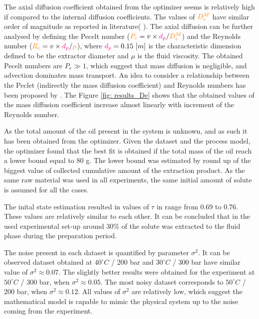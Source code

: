 \documentclass[../Article_Model_Parameters.tex]{subfiles}
\begin{document}
	The axial diffusion coefficient obtained from the optimizer seems is relatively high if compared to the internal diffusion coefficients. The values of ${\color{orange}D_e^M}$ have similar order of magnitude as reported in literature( \citet{ReisVasco2000}). %
	The axial diffusion can be further analysed by defining the Pecelt number (${\color{orange}P_e} = v \times {\color{magenta}d_p} / {\color{orange}D_e^M} $) and the Reynolds number (${\color{orange}R_e} = v \times {\color{magenta}d_p} / {\color{orange}\mu} $), where ${\color{magenta}d_p}=0.15~[m]$ is the characteristic dimension defined to be the extractor diameter and $\mu$ is the fluid viscosity. %
	The obtained Pecelt numbers are $P_e \gg 1$, which suggest that mass diffusion is negligible, and advection dominates mass transport. An idea to consider a relationship between the Peclet (indirectly the mass diffusion coefficient) and Reynolds numbers has been proposed by \citet{Chung1968}. 
	The Figure \ref{fig: results_De} shows that the obtained values of the mass diffusion coefficient increase almost linearly with increment of the Reynolds number.

	As the total amount of the oil present in the system is unknown, and as such it has been obtained from the optimizer. Given the dataset and the process model, the optimizer found that the best fit is obtained if the total mass of the oil reach a lower bound equal to 80 g. The lower bound was estimated by round up of the biggest value of collected cumulative amount of the extraction product. As the same raw material was used in all experiments, the same initial amount of solute is assumed for all the cases.
	
	The inital state estimation resulted in values of $\tau$ in range from 0.69 to 0.76. These values are relatively similar to each other. It can be concluded that in the used experimental set-up around 30\% of the solute was extracted to the fluid phase during the preparation period. 
	
	The noise present in each dataset is quantified by parameter $\sigma^2$. It can be observed dataset obtained at $40 ^\circ C$ / 200 bar and $30 ^\circ C$ / 300 bar have similar value of $\sigma^2\approx0.07$. The slightly better results were obtained for the experiment at $50 ^\circ C$ / 300 bar, when $\sigma^2\approx0.05$. The most noisy dataset corresponds to $50 ^\circ C$ / 200 bar, when $\sigma^2\approx0.12$. All values of $\sigma^2$ are relatively low, which suggest the mathematical model is capable to mimic the physical system up to the noise coming from the experiment.
\end{document}
